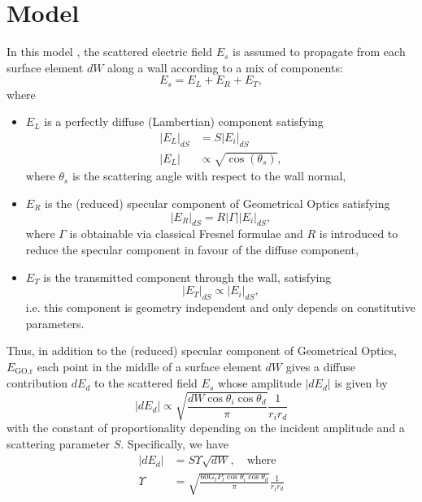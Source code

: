 \documentclass[lettersize,journal]{IEEEtran}
\begin{document}
\section{Model} In this model \cite{DegliEsposti1999Diffuse}, the scattered electric 
field $E_s$ is assumed to propagate from each surface element $dW$ along a wall 
according to a mix of components:
\begin{equation}
   E_s = E_L + E_R + E_T, 
\end{equation} where
\begin{itemize}
   \item $E_L$ is a perfectly diffuse (Lambertian) component satisfying
      \begin{subequations}
         \begin{align}
            \lvert E_L \rvert_{dS} &= S \lvert E_i \rvert_{dS} \label{SDefinition} \\
            \lvert E_L \rvert &\propto \sqrt{\cos( \theta_s ) }, 
            \label{LambertianAssumption}
         \end{align}
      \end{subequations} where $\theta_s$ is the scattering angle with respect to
      the wall normal,
   \item $E_R$ is the (reduced) specular component of Geometrical Optics satisfying
      \begin{equation} \label{specularComponent}
         \lvert E_R \rvert_{dS} = R \lvert \Gamma \rvert \lvert E_i \rvert_{dS},
      \end{equation} where $\Gamma$ is obtainable via classical Fresnel formulae and
      $R$ is introduced to reduce the specular component in favour of the diffuse 
      component,
   \item $E_T$ is the transmitted component through the wall, satisfying
      \begin{equation}
         \lvert E_T \rvert_{dS} \propto \lvert E_i \rvert_{dS},
         \label{transmittedGeometryIndependent}
      \end{equation} i.e. this component is geometry independent and only depends on
      constitutive parameters.
\end{itemize}

Thus, in addition to the (reduced) specular component of Geometrical Optics,
$E_{\text{GO,r}}$ each point in the middle of a surface element $dW$ gives a diffuse
contribution $dE_d$ to the scattered field $E_s$ whose amplitude $\lvert
dE_d \rvert$ is given by
\begin{equation} \label{scatteringAmpER}
   \lvert dE_d \rvert \propto \sqrt{\frac{dW \cos \theta_i \cos
   \theta_d}{\pi}} \frac{1}{r_i r_d}
\end{equation}
with the constant of proportionality depending on the incident amplitude and a
scattering parameter $S$. Specifically, we have
\begin{subequations}
   \begin{align}
      \lvert dE_d \rvert &= S \Upsilon \sqrt{dW}, \quad \text{where} \\
      \Upsilon &= \sqrt{\frac{60 G_t P_t \cos \theta_i \cos \theta_d}{\pi}}
      \frac{1}{r_i r_d}
   \end{align}
\end{subequations}
\end{document}

